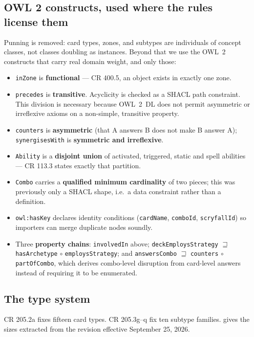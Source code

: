 \documentclass[11pt,a4paper]{article}
\begin{document}
\subsection{OWL 2 constructs, used where the rules license them}

Punning is removed: card types, zones, and subtypes are individuals of concept classes, not classes doubling as instances. Beyond that we use the OWL~2 constructs that carry real domain weight, and only those:

\begin{itemize}[leftmargin=1.2em, itemsep=1pt]
  \item \texttt{inZone} is \textbf{functional} --- CR 400.5, an object exists in exactly one zone.
  \item \texttt{precedes} is \textbf{transitive}. Acyclicity is checked as a SHACL path constraint. This division is necessary because OWL~2~DL does not permit asymmetric or irreflexive axioms on a non-simple, transitive property.
  \item \texttt{counters} is \textbf{asymmetric} (that A answers B does not make B answer A); \texttt{synergisesWith} is \textbf{symmetric and irreflexive}.
  \item \texttt{Ability} is a \textbf{disjoint union} of activated, triggered, static and spell abilities --- CR 113.3 states exactly that partition.
  \item \texttt{Combo} carries a \textbf{qualified minimum cardinality} of two pieces; this was previously only a SHACL shape, i.e.\ a data constraint rather than a definition.
  \item \texttt{owl:hasKey} declares identity conditions (\texttt{cardName}, \texttt{comboId}, \texttt{scryfallId}) so importers can merge duplicate nodes soundly.
  \item Three \textbf{property chains}: \texttt{involvedIn} above; \texttt{deckEmploysStrategy} $\sqsupseteq$ \texttt{hasArchetype} $\circ$ \texttt{employsStrategy}; and \texttt{answersCombo} $\sqsupseteq$ \texttt{counters} $\circ$ \texttt{partOfCombo}, which derives combo-level disruption from card-level answers instead of requiring it to be enumerated.
\end{itemize}

\subsection{The type system}
\label{sec:types}

CR 205.2a fixes fifteen card types. CR 205.3g--q fix ten subtype families.  gives the sizes extracted from the revision effective September 25, 2026.
\end{document}
